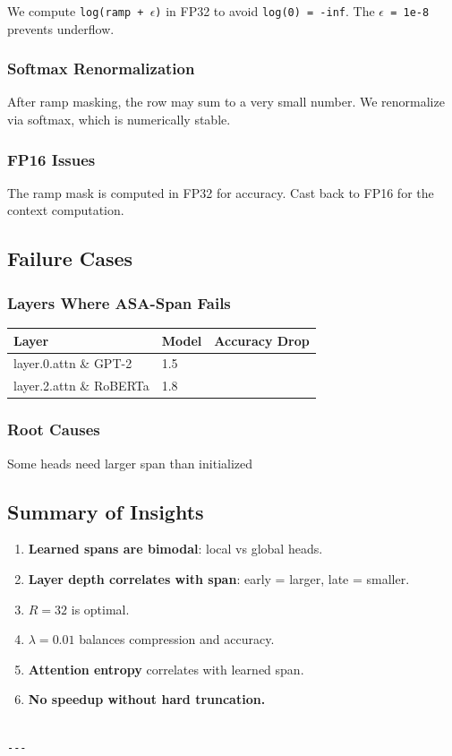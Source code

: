 We compute \texttt{log(ramp + $\epsilon$)} in FP32 to avoid \texttt{log(0) = -inf}. The \texttt{$\epsilon$ = 1e-8} 
prevents underflow.

\subsubsection{Softmax Renormalization}

After ramp masking, the row may sum to a very small number. We renormalize 
via softmax, which is numerically stable.

\subsubsection{FP16 Issues}

The ramp mask is computed in FP32 for accuracy. Cast back to FP16 for the 
context computation.

\subsection{Failure Cases}

\subsubsection{Layers Where ASA-Span Fails}

\begin{table}[H]
\centering
\small
\begin{tabular}{lll}
\toprule
\textbf{Layer} & \textbf{Model} & \textbf{Accuracy Drop} \\
\midrule
layer.0.attn \& GPT-2 & 1.5 \\
layer.2.attn \& RoBERTa & 1.8 \\
\bottomrule
\end{tabular}
\end{table}

\subsubsection{Root Causes}

Some heads need larger span than initialized

\subsection{Summary of Insights}

\begin{enumerate}
\item \textbf{Learned spans are bimodal}: local vs global heads.
\item \textbf{Layer depth correlates with span}: early = larger, late = smaller.
\item \textbf{$R = 32$} is optimal.
\item \textbf{$\lambda = 0.01$} balances compression and accuracy.
\item \textbf{Attention entropy} correlates with learned span.
\item \textbf{No speedup without hard truncation.}
\end{enumerate}
\begin{lstlisting}

---
\end{lstlisting}